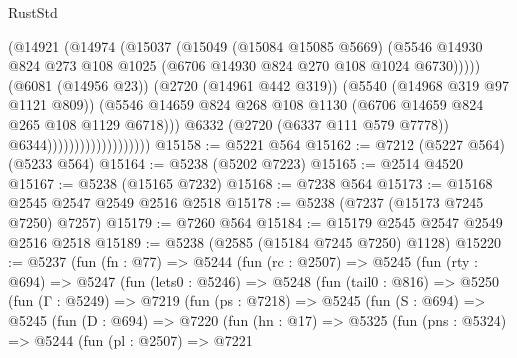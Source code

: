 \begin{lexlean}{RustStd}
\begin{coremodule}
                                          (@14921
                                            (@14974
                                              (@15037
                                                (@15049
                                                  (@15084 @15085 @5669)
                                                  (@5546
                                                    @14930
                                                    @824
                                                    @273
                                                    @108
                                                    @1025
                                                    (@6706 @14930 @824 @270 @108 @1024 @6730)))))
                                            (@6081 (@14956 @23))
                                            (@2720 (@14961 @442 @319))
                                            (@5540 (@14968 @319 @97 @1121 @809))
                                            (@5546
                                              @14659
                                              @824
                                              @268
                                              @108
                                              @1130
                                              (@6706 @14659 @824 @265 @108 @1129 @6718)))
                                          @6332
                                          (@2720 (@6337 @111 @579 @7778))
                                          @6344)))))))))))))))))))
@15158 := @5221 @564
@15162 := @7212 (@5227 @564) (@5233 @564)
@15164 := @5238 (@5202 @7223)
@15165 := @2514 @4520
@15167 := @5238 (@15165 @7232)
@15168 := @7238 @564
@15173 := @15168 @2545 @2547 @2549 @2516 @2518
@15178 := @5238 (@7237 (@15173 @7245 @7250) @7257)
@15179 := @7260 @564
@15184 := @15179 @2545 @2547 @2549 @2516 @2518
@15189 := @5238 (@2585 (@15184 @7245 @7250) @1128)
@15220 := @5237
    (fun (fn : @77) =>
    @5244
      (fun (rc : @2507) =>
      @5245
        (fun (rty : @694) =>
        @5247
          (fun (lets0 : @5246) =>
          @5248
            (fun (tail0 : @816) =>
            @5250
              (fun (Γ : @5249) =>
              @7219
                (fun (ps : @7218) =>
                @5245
                  (fun (S : @694) =>
                  @5245
                    (fun (D : @694) =>
                    @7220
                      (fun (hn : @17) =>
                      @5325
                        (fun (pns : @5324) =>
                        @5244
                          (fun (pl : @2507) =>
                          @7221

\end{coremodule}
\end{lexlean}
